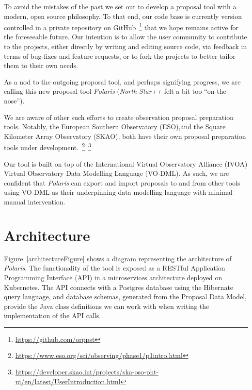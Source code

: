 \documentclass[11pt,twoside]{article}
\begin{document}
To avoid the mistakes of the past we set out to develop a proposal tool with a modern, open source philosophy.
To that end, our code base is currently version controlled in a private repository on
GitHub~\footnote{\url{https://github.com/orppst}} that we hope remains active for the foreseeable future.
Our intention is to allow the user community to contribute to the projects, either directly by writing and
editing source code, via feedback in terms of bug-fixes and feature requests, or to fork the projects to
better tailor them to their own needs.

As a nod to the outgoing proposal tool, and perhaps signifying progress, we are calling this new proposal tool
\emph{Polaris} (\emph{North Star++} felt a bit too ``on-the-nose'').

We are aware of other such efforts to create observation proposal preparation tools.
Notably, the European Southern Observatory (ESO),and the Square Kilometer Array Observatory (SKAO),
both have their own proposal preparation tools under development.~\footnote{\url{https://www.eso.org/sci/observing/phase1/p1intro.html}}~\footnote{\url{https://developer.skao.int/projects/ska-oso-pht-ui/en/latest/UserIntroduction.html}}

Our tool is built on top of the International Virtual Observatory Alliance (IVOA) Virtual
Observatory Data Modelling Language (VO-DML).
As such, we are confident that \emph{Polaris} can export and import proposals to and from other tools using
VO-DML as their underpinning data modelling language with minimal manual intervention.

\section{Architecture}\label{sec:architecture}

Figure~\ref{architectureFigure} shows a diagram representing the architecture of \emph{Polaris}.
The functionality of the tool is exposed as a RESTful Application Programming Interface (API) in a
microservices architecture deployed on Kubernetes.
The API connects with a Postgres database using the Hibernate query language, and database schemas, generated
from the Proposal Data Model, provide the Java class definitions we can work with when writing the implementation
of the API calls.

\end{document}
